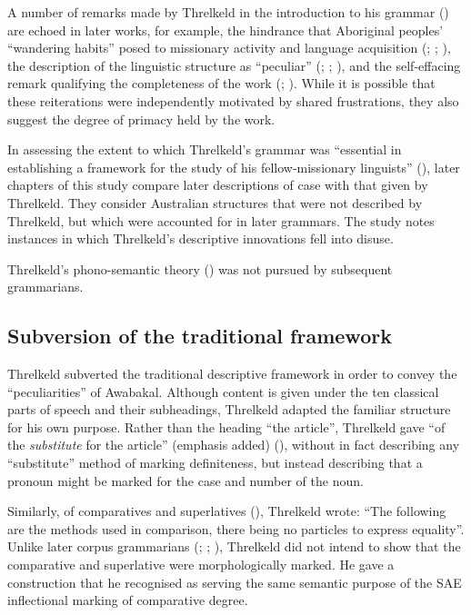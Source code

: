 A number of remarks made by Threlkeld in the introduction to his grammar (\citeyear[v--xii]{threlkeld_australian_1834}) are echoed in later works, for example, the hindrance that Aboriginal peoples' “wandering habits” posed to missionary activity and language acquisition (\citealt[xi]{threlkeld_australian_1834}; \citealt[v]{meyer_vocabulary_1843}; \citealt[1]{kempe_grammar_1891}), the description of the linguistic structure as “peculiar” (\citealt[ix]{threlkeld_australian_1834}; \citealt[lxii]{thomas_succinct_1878}; \citealt[1]{kempe_grammar_1891}), and the self-effacing remark qualifying the completeness of the work (\citealt[ix]{threlkeld_australian_1834}; \citealt[v]{meyer_vocabulary_1843}). While it is possible that these reiterations were independently motivated by shared frustrations, they also suggest the degree of primacy held by the work. 

In assessing the extent to which Threlkeld’s grammar was “essential in establishing a framework for the study of his fellow-missionary linguists” (\citealt[269]{carey_lancelot_2004}), later chapters of this study compare later descriptions of case with that given by Threlkeld. They consider Australian structures that were not described by Threlkeld, but which were accounted for in later grammars. The study notes instances in which Threlkeld’s descriptive innovations fell into disuse. 

\hspace*{-3.1pt}Threlkeld’s phono-semantic theory () was not pursued by subsequent grammarians.

\subsection{Subversion of the traditional framework }
\label{sec:key:3.3.2}

Threlkeld subverted the traditional descriptive framework in order to convey the “peculiarities” of Awabakal. Although content is given under the ten classical parts of speech and their subheadings, Threlkeld adapted the familiar structure for his own purpose. Rather than the heading ``the article'', Threlkeld gave “of the \textit{substitute} for the article'' (emphasis added) (\citeyear[9]{threlkeld_australian_1834}), without in fact describing any “substitute” method of marking definiteness, but instead describing that a pronoun might be marked for the case and number of the noun.

Similarly, of comparatives and superlatives (\citeyear[17]{threlkeld_australian_1834}), Threlkeld wrote: “The following are the methods used in comparison, there being no particles to express equality”. Unlike later corpus grammarians (\citealt{schwarz_koko_1900}; \citealt{roth_structure_1901}; \citealt{strehlow_aranda_1944}), Threlkeld did not intend to show that the comparative and superlative were morphologically marked. He gave a construction that he recognised as serving the same semantic purpose of the SAE inflectional marking of comparative degree.

